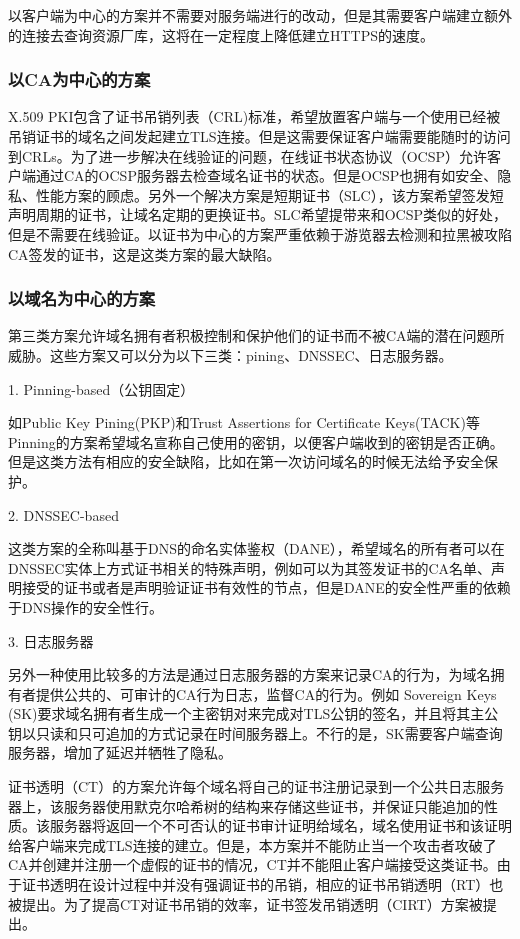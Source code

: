 以客户端为中心的方案并不需要对服务端进行的改动，但是其需要客户端建立额外的连接去查询资源厂库，这将在一定程度上降低建立HTTPS的速度。


\subsubsection{以CA为中心的方案}

X.509 PKI包含了证书吊销列表（CRL)标准，希望放置客户端与一个使用已经被吊销证书的域名之间发起建立TLS连接。但是这需要保证客户端需要能随时的访问到CRLs。为了进一步解决在线验证的问题，在线证书状态协议（OCSP）允许客户端通过CA的OCSP服务器去检查域名证书的状态。但是OCSP也拥有如安全、隐私、性能方案的顾虑。另外一个解决方案是短期证书（SLC），该方案希望签发短声明周期的证书，让域名定期的更换证书。SLC希望提带来和OCSP类似的好处，但是不需要在线验证。以证书为中心的方案严重依赖于游览器去检测和拉黑被攻陷CA签发的证书，这是这类方案的最大缺陷。


\subsubsection{以域名为中心的方案}


第三类方案允许域名拥有者积极控制和保护他们的证书而不被CA端的潜在问题所威胁。这些方案又可以分为以下三类：pining、DNSSEC、日志服务器。

1. Pinning-based（公钥固定）

如Public Key Pining(PKP)和Trust Assertions for Certificate Keys(TACK)等Pinning的方案希望域名宣称自己使用的密钥，以便客户端收到的密钥是否正确。但是这类方法有相应的安全缺陷，比如在第一次访问域名的时候无法给予安全保护。

2. DNSSEC-based

这类方案的全称叫基于DNS的命名实体鉴权（DANE），希望域名的所有者可以在DNSSEC实体上方式证书相关的特殊声明，例如可以为其签发证书的CA名单、声明接受的证书或者是声明验证证书有效性的节点，但是DANE的安全性严重的依赖于DNS操作的安全性行。


3. 日志服务器

另外一种使用比较多的方法是通过日志服务器的方案来记录CA的行为，为域名拥有者提供公共的、可审计的CA行为日志，监督CA的行为。例如 Sovereign Keys (SK)要求域名拥有者生成一个主密钥对来完成对TLS公钥的签名，并且将其主公钥以只读和只可追加的方式记录在时间服务器上。不行的是，SK需要客户端查询服务器，增加了延迟并牺牲了隐私。

证书透明（CT）的方案允许每个域名将自己的证书注册记录到一个公共日志服务器上，该服务器使用默克尔哈希树的结构来存储这些证书，并保证只能追加的性质。该服务器将返回一个不可否认的证书审计证明给域名，域名使用证书和该证明给客户端来完成TLS连接的建立。但是，本方案并不能防止当一个攻击者攻破了CA并创建并注册一个虚假的证书的情况，CT并不能阻止客户端接受这类证书。由于证书透明在设计过程中并没有强调证书的吊销，相应的证书吊销透明（RT）也被提出。为了提高CT对证书吊销的效率，证书签发吊销透明（CIRT）方案被提出。

